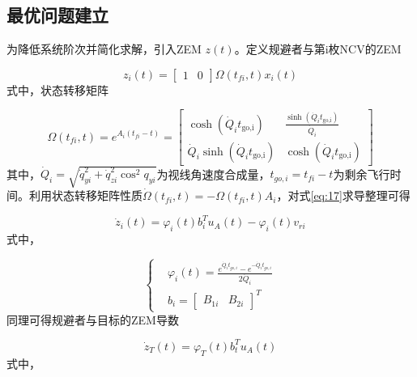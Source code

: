 \subsection{最优问题建立}
为降低系统阶次并简化求解，引入ZEM $z(t)$。定义规避者与第i枚NCV的ZEM

\begin{equation}
\label{eq:17}
{z_i}(t) = \left[ {\begin{array}{*{20}{c}}
  1&0 
\end{array}} \right]\Omega \left( {{t_{fi}},t} \right){x_i}(t)
\end{equation}
式中，状态转移矩阵

\begin{equation}
\label{eq:18}
\Omega \left( {{t_{fi}},t} \right) = {e^{{A_i}\left( {{t_{fi}} - t} \right)}} = \left[ {\begin{array}{*{20}{c}}
  {\cosh ({{\dot Q}_i}{t_{{\text{go,i}}}})}&{\frac{{\sinh ({{\dot Q}_i}{t_{{\text{go,i}}}})}}{{{{\dot Q}_i}}}} \\ 
  {{{\dot Q}_i}\sinh ({{\dot Q}_i}{t_{{\text{go,i}}}})}&{\cosh ({{\dot Q}_i}{t_{{\text{go,i}}}})} 
\end{array}} \right]
\end{equation}
其中，${\dot Q_i} = \sqrt {\dot q_{yi}^2 + \dot q_{zi}^2{{\cos }^2}{q_{yi}}} $为视线角速度合成量，${t_{go,i}} = {t_{fi}} - t$为剩余飞行时间。利用状态转移矩阵性质$\dot \Omega \left( {{t_{fi}},t} \right) =  - \Omega \left( {{t_{fi}},t} \right){A_i}$，对式\eqref{eq:17}求导整理可得

\begin{equation}
\label{eq:19}
{\dot z_i}(t) = {\varphi _i}(t)b_i^T{u_A}(t) - {\varphi _i}(t){v_{ri}}
\end{equation}
式中，

\begin{equation}
\label{eq:20}
\left\{
\begin{aligned}
& {\varphi _i}(t) = \frac{{{e^{{{\dot Q}_i}{t_{go,i}}}} - {e^{ - {{\dot Q}_i}{t_{go,i}}}}}}{{2{{\dot Q}_i}}} \\
& {b_i} = {\left[ {\begin{array}{*{20}{c}}
  {{B_{1i}}}&{{B_{2i}}}
\end{array}} \right]^T}
\end{aligned}
\right.
\end{equation}
同理可得规避者与目标的ZEM导数

\begin{equation}
\label{eq:21}
{\dot z_T}(t) = {\varphi _T}(t)b_t^T{u_A}(t)
\end{equation}
式中，


